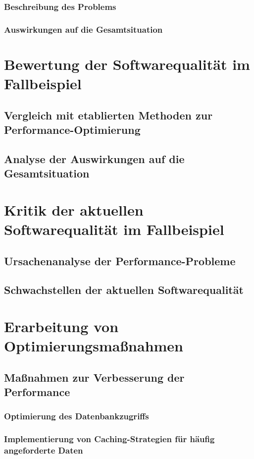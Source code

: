 \documentclass{article}
\begin{document}
\subsubsection{Beschreibung des Problems}
\subsubsection{Auswirkungen auf die Gesamtsituation}

\section{Bewertung der Softwarequalität im Fallbeispiel}
\subsection{Vergleich mit etablierten Methoden zur Performance-Optimierung}
\subsection{Analyse der Auswirkungen auf die Gesamtsituation}

\section{Kritik der aktuellen Softwarequalität im Fallbeispiel}
\subsection{Ursachenanalyse der Performance-Probleme}
\subsection{Schwachstellen der aktuellen Softwarequalität}

\section{Erarbeitung von Optimierungsmaßnahmen}
\subsection{Maßnahmen zur Verbesserung der Performance}
\subsubsection{Optimierung des Datenbankzugriffs}
\subsubsection{Implementierung von Caching-Strategien für häufig angeforderte Daten}
\end{document}
